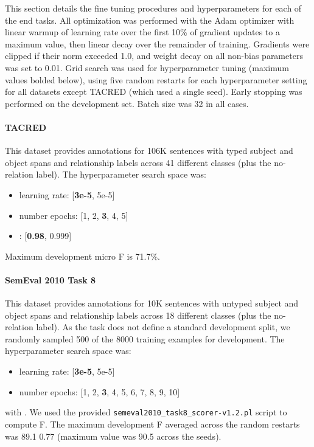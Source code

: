 \documentclass[11pt,a4paper]{article}
\begin{document}
This section details the fine tuning procedures and hyperparameters for each of the end tasks.
All optimization was performed with the Adam optimizer with linear warmup of learning rate over the first 10\% of gradient updates to a maximum value, then linear decay over the remainder of training.   Gradients were clipped if their norm exceeded 1.0, and weight decay on all non-bias parameters was set to 0.01.
Grid search was used for hyperparameter tuning (maximum values bolded below), using five random restarts for each hyperparameter setting for all datasets except TACRED (which used a single seed).
Early stopping was performed on the development set.  Batch size was 32 in all cases.

\paragraph{TACRED}
This dataset provides annotations for 106K sentences with typed subject and object spans and relationship labels across 41 different classes (plus the no-relation label).
The hyperparameter search space was:
\begin{itemize}
    \item learning rate: [\textbf{3e-5}, 5e-5]
    \item number epochs: [1, 2, \textbf{3}, 4, 5]
    \item : [\textbf{0.98}, 0.999]
\end{itemize}
Maximum development micro F is 71.7\%.

\paragraph{SemEval 2010 Task 8}
This dataset provides annotations for 10K sentences with untyped subject and object spans and relationship labels across 18 different classes (plus the no-relation label).
As the task does not define a standard development split, we randomly sampled 500 of the 8000 training examples for development.
The hyperparameter search space was:
\begin{itemize}
    \item learning rate: [\textbf{3e-5}, 5e-5]
    \item number epochs: [1, 2, \textbf{3}, 4, 5, 6, 7, 8, 9, 10]
\end{itemize}
with .  We used the provided \texttt{semeval2010\_task8\_scorer-v1.2.pl} script to compute F.  The maximum development F averaged across the random restarts was 89.1  0.77 (maximum value was 90.5 across the seeds).
\end{document}
